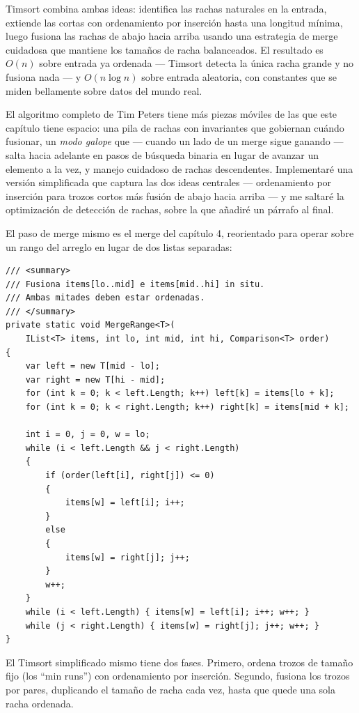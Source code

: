 \documentclass[11pt,a4paper]{article}
\begin{document}
Timsort combina ambas ideas: identifica las rachas naturales en la entrada, extiende las cortas con ordenamiento por inserción hasta una longitud mínima, luego fusiona las rachas de abajo hacia arriba usando una estrategia de merge cuidadosa que mantiene los tamaños de racha balanceados. El resultado es $O(n)$ sobre entrada ya ordenada --- Timsort detecta la única racha grande y no fusiona nada --- y $O(n \log n)$ sobre entrada aleatoria, con constantes que se miden bellamente sobre datos del mundo real.

El algoritmo completo de Tim Peters tiene más piezas móviles de las que este capítulo tiene espacio: una pila de rachas con invariantes que gobiernan cuándo fusionar, un \emph{modo galope} que --- cuando un lado de un merge sigue ganando --- salta hacia adelante en pasos de búsqueda binaria en lugar de avanzar un elemento a la vez, y manejo cuidadoso de rachas descendentes. Implementaré una versión simplificada que captura las dos ideas centrales --- ordenamiento por inserción para trozos cortos más fusión de abajo hacia arriba --- y me saltaré la optimización de detección de rachas, sobre la que añadiré un párrafo al final.

El paso de merge mismo es el merge del capítulo 4, reorientado para operar sobre un rango del arreglo en lugar de dos listas separadas:

\begin{lstlisting}[caption={\texttt{MergeRange}: fusiona \texttt{items[lo..mid]} e \texttt{items[mid..hi]}}]
/// <summary>
/// Fusiona items[lo..mid] e items[mid..hi] in situ.
/// Ambas mitades deben estar ordenadas.
/// </summary>
private static void MergeRange<T>(
    IList<T> items, int lo, int mid, int hi, Comparison<T> order)
{
    var left = new T[mid - lo];
    var right = new T[hi - mid];
    for (int k = 0; k < left.Length; k++) left[k] = items[lo + k];
    for (int k = 0; k < right.Length; k++) right[k] = items[mid + k];

    int i = 0, j = 0, w = lo;
    while (i < left.Length && j < right.Length)
    {
        if (order(left[i], right[j]) <= 0)
        {
            items[w] = left[i]; i++;
        }
        else
        {
            items[w] = right[j]; j++;
        }
        w++;
    }
    while (i < left.Length) { items[w] = left[i]; i++; w++; }
    while (j < right.Length) { items[w] = right[j]; j++; w++; }
}
\end{lstlisting}

El Timsort simplificado mismo tiene dos fases. Primero, ordena trozos de tamaño fijo (los ``min runs'') con ordenamiento por inserción. Segundo, fusiona los trozos por pares, duplicando el tamaño de racha cada vez, hasta que quede una sola racha ordenada.
\end{document}
